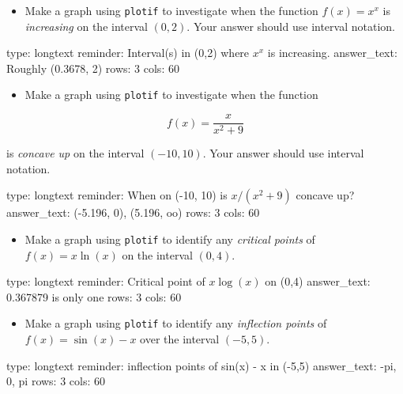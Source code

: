 \documentclass[12pt]{article}
\begin{document}
\begin{itemize}
\itemsep1pt\parskip0pt
\item
  Make a graph using \texttt{plotif} to investigate when the function
  $f(x) =   x^x$ is \emph{increasing} on the interval $(0,2)$. Your
  answer should use interval notation.
\end{itemize}

\begin{answer}
type: longtext
reminder: Interval(s) in (0,2) where \( x^x \) is increasing.
answer_text: Roughly (0.3678, 2) 
rows: 3
cols: 60
\end{answer}

\begin{itemize}
\itemsep1pt\parskip0pt
\item
  Make a graph using \texttt{plotif} to investigate when the function
\end{itemize}

\[
f(x) = \frac{x}{x^2+9}
\]

is \emph{concave up} on the interval $(-10,10)$. Your answer should use
interval notation.

\begin{answer}
type: longtext
reminder: When on (-10, 10) is \( x/(x^2 + 9) \) concave up?
answer_text: (-5.196, 0), (5.196, oo) 
rows: 3
cols: 60
\end{answer}

\begin{itemize}
\itemsep1pt\parskip0pt
\item
  Make a graph using \texttt{plotif} to identify any \emph{critical
  points} of $f(x) = x \ln(x)$ on the interval $(0,4)$.
\end{itemize}

\begin{answer}
type: longtext
reminder: Critical point of \( x \log(x) \) on (0,4)
answer_text: 0.367879 is only one 
rows: 3
cols: 60
\end{answer}

\begin{itemize}
\itemsep1pt\parskip0pt
\item
  Make a graph using \texttt{plotif} to identify any \emph{inflection
  points} of $f(x) = \sin(x) - x$ over the interval $(-5,5)$.
\end{itemize}

\begin{answer}
type: longtext
reminder: inflection points of sin(x) - x in (-5,5)
answer_text: -pi, 0, pi 
rows: 3
cols: 60
\end{answer}
\end{document}
